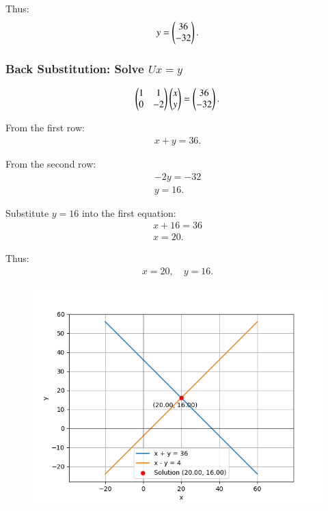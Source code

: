 \documentclass[journal,12pt,onecolumn]{IEEEtran}
\theoremstyle{remark}
\begin{document}
Thus:
\begin{align}
{y} = \begin{pmatrix}36 \\ -32\end{pmatrix}.
\end{align}

\subsubsection*{Back Substitution: Solve $Ux = y$}
\begin{align}
\begin{pmatrix}1 & 1 \\ 0 & -2\end{pmatrix}
\begin{pmatrix}x \\ y\end{pmatrix}
=
\begin{pmatrix}36 \\ -32\end{pmatrix}.
\end{align}

From the first row:
\begin{align}
x + y = 36.
\end{align}

From the second row:
\begin{align}
-2y = -32 \\
y = 16.
\end{align}

Substitute $y = 16$ into the first equation:
\begin{align}
x + 16 = 36 \\
x = 20.
\end{align}

Thus:
\begin{align}
x = 20, \quad y = 16.
\end{align}





\begin{figure}[H]
    \centering
    \includegraphics[width=\columnwidth]{figs/fig.png}
 \end{figure}
\end{document}
